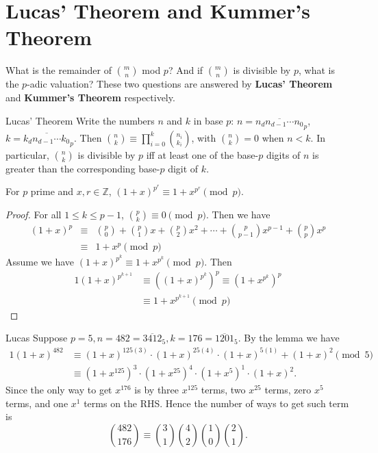 \section{Lucas' Theorem and Kummer's Theorem}

What is the remainder of ${m\choose n}$ mod $p$? And if ${m\choose n}$ is divisible by $p$, what is the $p$-adic valuation? These two questions are answered by \textbf{Lucas' Theorem} and \textbf{Kummer's Theorem} respectively.

\begin{theorem}[thm:]{Lucas' Theorem}
    Write the numbers $n$ and $k$ in base $p$: $n=\overline{n_dn_{d-1}\cdots n_0}_p$, $k=\overline{k_dn_{d-1}\cdots k_0}_p$.
    Then ${n\choose k}\equiv \prod_{i=0}^{k}{n_i\choose k_i}$, with ${n\choose k}=0$ when $n<k$. In particular, ${n\choose k}$ is divisible by $p$ iff at least one of the base-$p$ digits of $n$ is greater than the corresponding base-$p$ digit of $k$. 
\end{theorem}

\begin{lemma}[lem:]{}
    For $p$ prime and $x,r\in\mathbb{Z}$, $(1+x)^{p^r}\equiv 1+x^{p^r}\pmod{p}$.
    \begin{proof}
        For all $1\leq k \leq p-1$, $\binom{p}{k}\equiv 0 \pmod{p}$. Then we have
        \begin{eqnarray*}(1+x)^p&\equiv &\binom{p}{0}+\binom{p}{1}x+\binom{p}{2}x^2+\cdots+\binom{p}{p-1}x^{p-1}+\binom{p}{p}x^p\\ &\equiv& 1+x^p\pmod{p}\end{eqnarray*}
        Assume we have $(1+x)^{p^k}\equiv 1+x^{p^k}\pmod{p}$. Then
        \begin{alignat*}{1}
            (1+x)^{p^{k+1}} &\equiv\left((1+x)^{p^k}\right)^p\equiv\left(1+x^{p^k}\right)^p\\&\equiv1+x^{p^{k+1}}\pmod{p}
        \end{alignat*}
    \end{proof}
\end{lemma}

\begin{example}[exp:]{Lucas}
    Suppose $p=5, n=482=\overline{3412}_5, k=176=\overline{1201}_5$. By the lemma we have
    \begin{alignat*}{1}
        (1+x)^{482}&\equiv (1+x)^{125(3)}\cdot (1+x)^{25(4)}\cdot (1+x)^{5(1)}+(1+x)^2\pmod 5\\
                   &\equiv (1+x^{125})^3\cdot (1+x^{25})^4\cdot (1+x^5)^1\cdot (1+x)^2.
    \end{alignat*}
    Since the only way to get $x^{176}$ is by three $x^{125}$ terms, two $x^{25}$ terms, zero $x^{5}$ terms, and one $x^1$ terms on the RHS. Hence the number of ways to get such term is
    \[{482\choose 176}\equiv {3\choose 1}{4\choose 2}{1\choose 0}{2\choose 1}.\]
\end{example}

